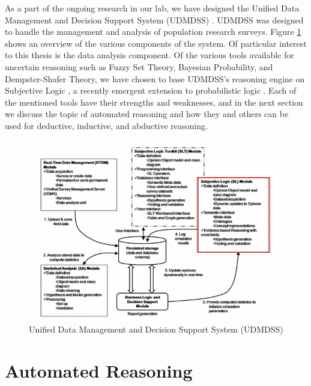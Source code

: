 \documentclass[thesis.tex]{subfiles}
\begin{document}
%
%



As a part of the ongoing research in our lab, we have designed the Unified Data Management
and Decision Support System (UDMDSS) \cite{kent2010towards,  kobti2011towards, kent2011design}.
UDMDSS was designed to handle
the management and analysis of population research surveys. Figure \ref{fig:udmdss} shows an overview
of the various components of the system. Of particular interest to this thesis is the
data analysis component. Of the various tools available for uncertain reasoning such as
Fuzzy Set Theory, Bayesian Probability, and Dempster-Shafer Theory, we have chosen to base
UDMDSS's reasoning engine on Subjective Logic \cite{kent2010application}, a recently emergent
extension to probabilistic logic \cite{josang2001logic}.
Each of the mentioned tools have their strengths and weaknesses, and in the next section we discuss
the topic of automated reasoning and how they and others can be used for deductive,
inductive, and abductive reasoning.

\begin{figure}[ht!]
  \centering
  \includegraphics[width=\textwidth]{../img/udmdss.jpg}
  \caption{Unified Data Management and Decision Support System (UDMDSS) \cite{kent2010application}}
  \label{fig:udmdss}
\end{figure}







\section{Automated Reasoning}
\end{document}
